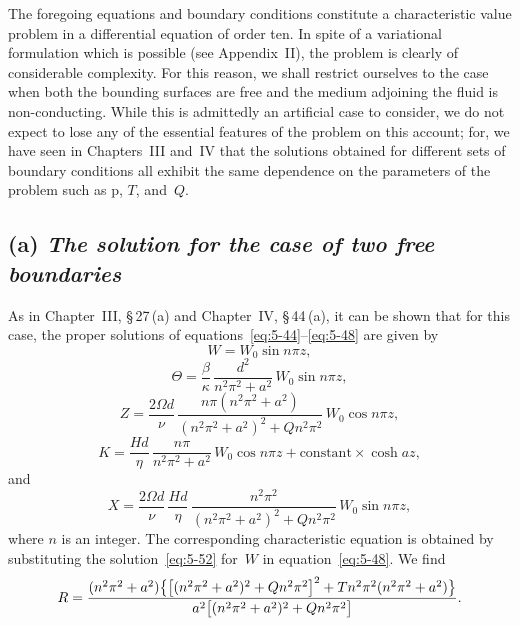The foregoing equations and boundary conditions constitute a characteristic
value problem in a differential equation of order ten.  In spite of a
variational formulation which is possible (see Appendix~II), the problem is
clearly of considerable complexity.  For this reason, we shall restrict
ourselves to the case when both the bounding surfaces are free and the medium
adjoining the fluid is non-conducting.  While this is admittedly an artificial
case to consider, we do not expect to lose any of the essential features of the
problem on this account; for, we have seen in Chapters~III and~IV that the
solutions obtained for different sets of boundary conditions all exhibit the
same dependence on the parameters of the problem such as $\mathrm{p}$, $T$,
and~$Q$.

\subsection*{(a) \textit{The solution for the case of two free boundaries}}

As in Chapter~III, \S\,27\,(a) and Chapter~IV, \S\,44\,(a), it can be shown
that for this case, the proper solutions of
equations~\eqref{eq:5-44}--\eqref{eq:5-48} are given by
\begin{equation}
  W = W_0\sin n\pi z,
  \label{eq:5-52}
\end{equation}
\begin{equation}
  \Theta = \frac{\beta}{\kappa}\,
  \frac{d^{2}}{n^{2}\pi^{2}+a^{2}}\,W_0\sin n\pi z,
  \label{eq:5-53}
\end{equation}
\begin{equation}
  Z = \frac{2\Omega d}{\nu}\,
  \frac{n\pi(n^{2}\pi^{2}+a^{2})}{(n^{2}\pi^{2}+a^{2})^{2}+Qn^{2}\pi^{2}}\,
  W_0\cos n\pi z,
  \label{eq:5-54}
\end{equation}
\begin{equation}
  K = \frac{Hd}{\eta}\,
  \frac{n\pi}{n^{2}\pi^{2}+a^{2}}\,
  W_0\cos n\pi z + \text{constant} \times \cosh az,
  \label{eq:5-55}
\end{equation}
and
\begin{equation}
  X = \frac{2\Omega d}{\nu}\,\frac{Hd}{\eta}\,
  \frac{n^{2}\pi^{2}}{(n^{2}\pi^{2}+a^{2})^{2}+Q n^{2}\pi^{2}}\,
  W_0\sin n\pi z,
  \label{eq:5-56}
\end{equation}
where $n$ is an integer.  The corresponding characteristic equation is
obtained by substituting the solution~\eqref{eq:5-52} for~$W$ in
equation~\eqref{eq:5-48}.  We find
\begin{equation}
  R = \frac{%
    (n^{2}\pi^{2}+a^{2})
    \bigl\{\bigl[(n^{2}\pi^{2}+a^{2})^{2}+Qn^{2}\pi^{2}\bigr]^{2}
    +Tn^{2}\pi^{2}(n^{2}\pi^{2}+a^{2})\bigr\}}{%
    a^{2}\bigl[(n^{2}\pi^{2}+a^{2})^{2}+Qn^{2}\pi^{2}\bigr]}.
  \label{eq:5-57}
\end{equation}

